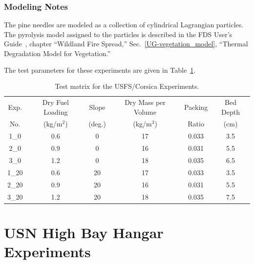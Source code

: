 \subsubsection{Modeling Notes}

The pine needles are modeled as a collection of cylindrical Lagrangian particles. The pyrolysis model assigned to the particles is described in the FDS User's Guide~\cite{FDS_Users_Guide}, chapter ``Wildland Fire Spread,'' Sec.~\ref{UG-vegetation_model}, ``Thermal Degradation Model for Vegetation.''

The test parameters for these experiments are given in Table~\ref{Corsica_Parameters}.

\begin{table}[ht!]
\begin{center}
\begin{tabular}{|c|c|c|c|c|c|}
\hline
Exp.         & Dry Fuel Loading    & Slope       & Dry Mass per Volume  & Packing & Bed Depth       \\
No.          & (kg/m$^2$)          & (deg.)    & (kg/m$^3$)           & Ratio   & (cm)          \\ \hline \hline
1\_0         & 0.6                 & 0         & 17                   & 0.033   & 3.5             \\ \hline
2\_0         & 0.9                 & 0         & 16                   & 0.031   & 5.5             \\ \hline
3\_0         & 1.2                 & 0         & 18                   & 0.035   & 6.5             \\ \hline
1\_20        & 0.6                 & 20        & 17                   & 0.033   & 3.5             \\ \hline
2\_20        & 0.9                 & 20        & 16                   & 0.031   & 5.5             \\ \hline
3\_20        & 1.2                 & 20        & 18                   & 0.035   & 7.5             \\ \hline
\end{tabular}
\end{center}
\caption[Test matrix for the USFS/Corsica Experiments]
{Test matrix for the USFS/Corsica Experiments.}
\label{Corsica_Parameters}
\end{table}



\section{USN High Bay Hangar Experiments}
\label{USN_High_Bay_Hangar_Description}


